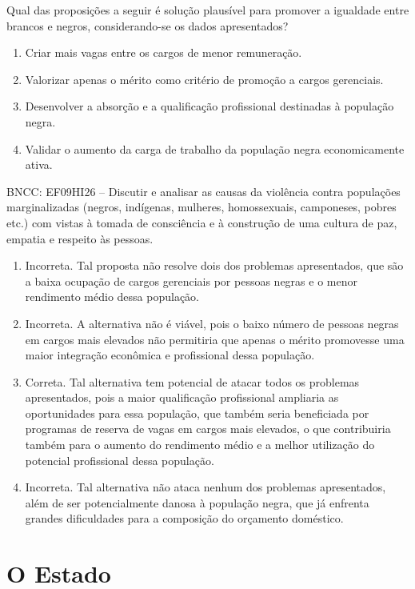 Qual das proposições a seguir é solução plausível para promover a
igualdade entre brancos e negros, considerando-se os dados apresentados?

\begin{enumerate}
\def\labelenumi{\alph{enumi})}
\item
  Criar mais vagas entre os cargos de menor remuneração.
\item
  Valorizar apenas o mérito como critério de promoção a cargos
  gerenciais.
\item
  Desenvolver a absorção e a qualificação profissional destinadas à
  população negra.
\item
  Validar o aumento da carga de trabalho da população negra
  economicamente ativa.
\end{enumerate}

BNCC: EF09HI26 -- Discutir e analisar as causas da violência contra
populações marginalizadas (negros, indígenas, mulheres, homossexuais,
camponeses, pobres etc.) com vistas à tomada de consciência e à
construção de uma cultura de paz, empatia e respeito às pessoas.

\begin{enumerate}
\def\labelenumi{\alph{enumi})}
\item
  Incorreta. Tal proposta não resolve dois dos problemas apresentados,
  que são a baixa ocupação de cargos gerenciais por pessoas negras e o
  menor rendimento médio dessa população.
\item
  Incorreta. A alternativa não é viável, pois o baixo número de pessoas
  negras em cargos mais elevados não permitiria que apenas o mérito
  promovesse uma maior integração econômica e profissional dessa
  população.
\item
  Correta. Tal alternativa tem potencial de atacar todos os problemas
  apresentados, pois a maior qualificação profissional ampliaria as
  oportunidades para essa população, que também seria beneficiada por
  programas de reserva de vagas em cargos mais elevados, o que
  contribuiria também para o aumento do rendimento médio e a melhor
  utilização do potencial profissional dessa população.
\item
  Incorreta. Tal alternativa não ataca nenhum dos problemas
  apresentados, além de ser potencialmente danosa à população negra, que
  já enfrenta grandes dificuldades para a composição do orçamento
  doméstico.
\end{enumerate}

\chapter{O Estado}

